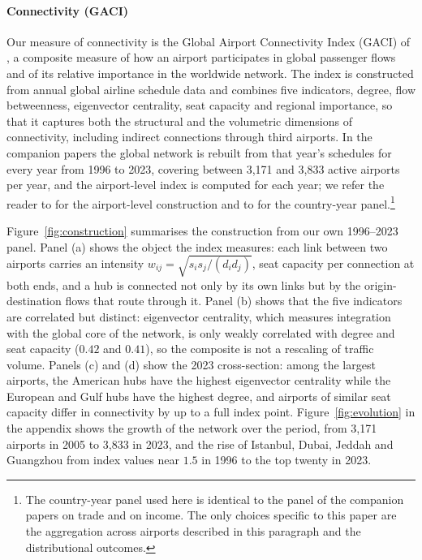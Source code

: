 \paragraph{Connectivity (GACI)}
Our measure of connectivity is the Global Airport Connectivity Index (GACI) of \citet{Cheung_2020}, a composite measure of how an airport participates in global passenger flows and of its relative importance in the worldwide network. The index is constructed from annual global airline schedule data and combines five indicators, degree, flow betweenness, eigenvector centrality, seat capacity and regional importance, so that it captures both the structural and the volumetric dimensions of connectivity, including indirect connections through third airports. In the companion papers the global network is rebuilt from that year's schedules for every year from 1996 to 2023, covering between 3{,}171 and 3{,}833 active airports per year, and the airport-level index is computed for each year; we refer the reader to \citet{Cheung_2020} for the airport-level construction and to \citet{Yue_2026} for the country-year panel.\footnote{The country-year panel used here is identical to the panel of the companion papers on trade and on income. The only choices specific to this paper are the aggregation across airports described in this paragraph and the distributional outcomes.}

Figure~\ref{fig:construction} summarises the construction from our own 1996--2023 panel. Panel (a) shows the object the index measures: each link between two airports carries an intensity $w_{ij}=\sqrt{s_i s_j/(d_i d_j)}$, seat capacity per connection at both ends, and a hub is connected not only by its own links but by the origin-destination flows that route through it. Panel (b) shows that the five indicators are correlated but distinct: eigenvector centrality, which measures integration with the global core of the network, is only weakly correlated with degree and seat capacity ($0.42$ and $0.41$), so the composite is not a rescaling of traffic volume. Panels (c) and (d) show the 2023 cross-section: among the largest airports, the American hubs have the highest eigenvector centrality while the European and Gulf hubs have the highest degree, and airports of similar seat capacity differ in connectivity by up to a full index point. Figure~\ref{fig:evolution} in the appendix shows the growth of the network over the period, from 3{,}171 airports in 2005 to 3{,}833 in 2023, and the rise of Istanbul, Dubai, Jeddah and Guangzhou from index values near $1.5$ in 1996 to the top twenty in 2023.

